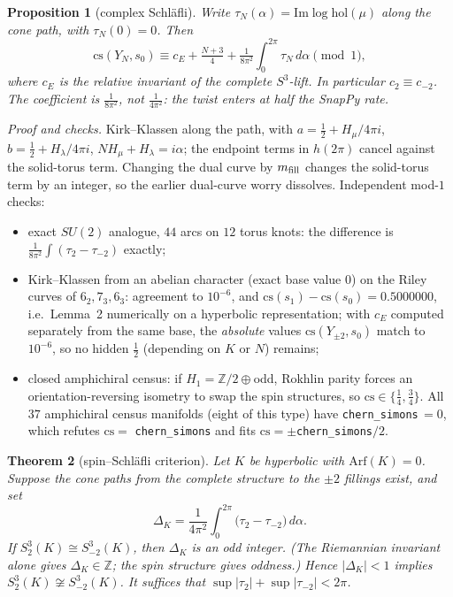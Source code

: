 \documentclass[10pt]{amsart}
\newtheorem{thm}{Theorem}\newtheorem{lem}[thm]{Lemma}\newtheorem{prop}[thm]{Proposition}\newtheorem{cor}[thm]{Corollary}
\begin{document}
\begin{prop}[complex Schl\"afli]
Write $\tau_N(\alpha)=\mathrm{Im}\log\mathrm{hol}(\mu)$ along the cone path, with $\tau_N(0)=0$. Then
\[
\mathrm{cs}(Y_N,s_0)\equiv c_E+\tfrac{N+3}4+\tfrac1{8\pi^2}\int_0^{2\pi}\tau_N\,d\alpha \pmod 1,
\]
where $c_E$ is the relative invariant of the complete $S^3$-lift. In particular $c_2\equiv c_{-2}$. The coefficient is
$\tfrac1{8\pi^2}$, not $\tfrac1{4\pi^2}$: the twist enters at \emph{half} the SnapPy rate.
\end{prop}
\noindent\emph{Proof and checks.} Kirk--Klassen along the path, with $a=\tfrac12+H_\mu/4\pi i$, $b=\tfrac12+H_\lambda/4\pi i$,
$NH_\mu+H_\lambda=i\alpha$; the endpoint terms in $h(2\pi)$ cancel against the solid-torus term. Changing the dual curve by
$m_{\rm fill}$ changes the solid-torus term by an integer, so the earlier dual-curve worry dissolves. Independent mod-$1$ checks:
\begin{itemize}
\item exact $SU(2)$ analogue, $44$ arcs on $12$ torus knots: the difference is $\tfrac1{8\pi^2}\int(\tau_2-\tau_{-2})$ exactly;
\item Kirk--Klassen from an abelian character (exact base value $0$) on the Riley curves of $6_2,7_3,6_3$: agreement to $10^{-6}$,
and $\mathrm{cs}(s_1)-\mathrm{cs}(s_0)=0.5000000$, i.e.\ Lemma~2 numerically on a hyperbolic representation;
with $c_E$ computed separately from the same base, the \emph{absolute} values $\mathrm{cs}(Y_{\pm2},s_0)$ match to $10^{-6}$,
so no hidden $\tfrac12$ (depending on $K$ or $N$) remains;
\item closed amphichiral census: if $H_1=\mathbb Z/2\oplus$odd, Rokhlin parity forces an orientation-reversing isometry to swap
the spin structures, so $\mathrm{cs}\in\{\tfrac14,\tfrac34\}$. All $37$ amphichiral census manifolds (eight of this type) have
\texttt{chern\_simons}$\,=0$, which refutes $\mathrm{cs}=$ \texttt{chern\_simons} and fits $\mathrm{cs}=\pm$\texttt{chern\_simons}$/2$.
\end{itemize}

\begin{thm}[spin--Schl\"afli criterion]
Let $K$ be hyperbolic with $\mathrm{Arf}(K)=0$. Suppose the cone paths from the complete structure to the
$\pm2$ fillings exist, and set
\[
\Delta_K=\frac1{4\pi^2}\int_0^{2\pi}\bigl(\tau_2-\tau_{-2}\bigr)\,d\alpha .
\]
If $S^3_2(K)\cong S^3_{-2}(K)$, then $\Delta_K$ is an \emph{odd integer}. (The Riemannian invariant alone gives
$\Delta_K\in\mathbb Z$; the spin structure gives oddness.) Hence $|\Delta_K|<1$ implies $S^3_2(K)\not\cong S^3_{-2}(K)$.
It suffices that $\sup|\tau_2|+\sup|\tau_{-2}|<2\pi$.
\end{thm}
\end{document}
